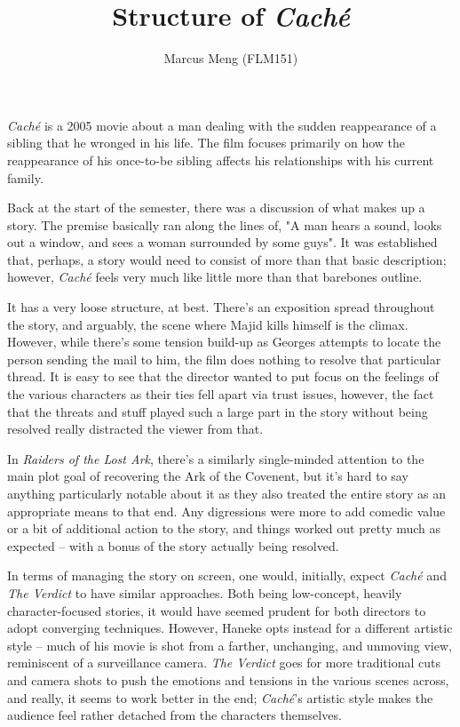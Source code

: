 \documentclass{article}
\title{Structure of \emph{Cach\'{e}}}
\author{Marcus Meng (FLM151)}
\begin{document}
\maketitle

\emph{Cach\'{e}} is a 2005 movie about a man dealing with the sudden reappearance of a sibling that he wronged in his life.
The film focuses primarily on how the reappearance of his once-to-be sibling affects his relationships with his current family.

Back at the start of the semester, there was a discussion of what makes up a story.
The premise basically ran along the lines of, "A man hears a sound, looks out a window, and sees a woman surrounded by some guys".
It was established that, perhaps, a story would need to consist of more than that basic description;
however, \emph{Cach\'{e}} feels very much like little more than that barebones outline.

It has a very loose structure, at best.
There's an exposition spread throughout the story, and arguably, the scene where Majid kills himself is the climax.
However, while there's some tension build-up as Georges attempts to locate the person sending the mail to him, the film does nothing to resolve that particular thread.
It is easy to see that the director wanted to put focus on the feelings of the various characters as their ties fell apart via trust issues, however, the fact that the threats and stuff played such a large part in the story without being resolved really distracted the viewer from that.

In \emph{Raiders of the Lost Ark}, there's a similarly single-minded attention to the main plot goal of recovering the Ark of the Covenent, but it's hard to say anything particularly notable about it as they also treated the entire story as an appropriate means to that end.
Any digressions were more to add comedic value or a bit of additional action to the story, and things worked out pretty much as expected -- with a bonus of the story actually being resolved.

In terms of managing the story on screen, one would, initially, expect \emph{Cach\'{e}} and \emph{The Verdict} to have similar approaches.
Both being low-concept, heavily character-focused stories, it would have seemed prudent for both directors to adopt converging techniques.
However, Haneke opts instead for a different artistic style -- much of his movie is shot from a farther, unchanging, and unmoving view, reminiscent of a surveillance camera.
\emph{The Verdict} goes for more traditional cuts and camera shots to push the emotions and tensions in the various scenes across, and really, it seems to work better in the end;
\emph{Cach\'{e}}'s artistic style makes the audience feel rather detached from the characters themselves.
\end{document}
